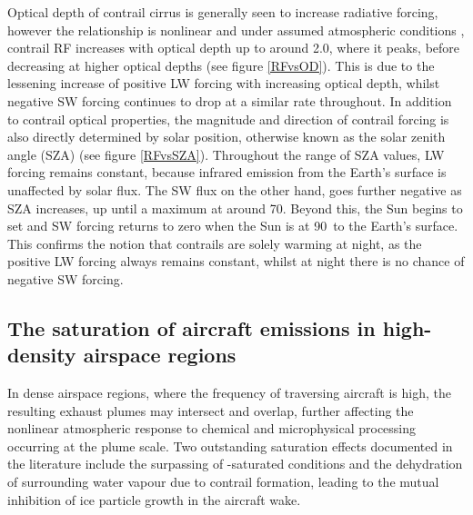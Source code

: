 Optical depth of contrail cirrus is generally seen to increase radiative forcing, however the relationship is nonlinear and under assumed atmospheric conditions \cite{Meerkotter1999, Schumann2012b}, contrail RF increases with optical depth up to around 2.0, where it peaks, before decreasing at higher optical depths (see figure \ref{RFvsOD}). This is due to the lessening increase of positive LW forcing with increasing optical depth, whilst negative SW forcing continues to drop at a similar rate throughout. In addition to contrail optical properties, the magnitude and direction of contrail forcing is also directly determined by solar position, otherwise known as the solar zenith angle (SZA) (see figure \ref{RFvsSZA}). Throughout the range of SZA values, LW forcing remains constant, because infrared emission from the Earth's surface is unaffected by solar flux. The SW flux on the other hand, goes further negative as SZA increases, up until a maximum at around 70\textdegree. Beyond this, the Sun begins to set and SW forcing returns to zero when the Sun is at 90\textdegree \ to the Earth's surface. This confirms the notion that contrails are solely warming at night, as the positive LW forcing always remains constant, whilst at night there is no chance of negative SW forcing.

\subsection{The saturation of aircraft emissions in high-density airspace regions}
\label{Saturation}
In dense airspace regions, where the frequency of traversing aircraft is high, the resulting exhaust plumes may intersect and overlap, further affecting the nonlinear atmospheric response to chemical and microphysical processing occurring at the plume scale. Two outstanding saturation effects documented in the literature include the surpassing of -saturated conditions and the dehydration of surrounding water vapour due to contrail formation, leading to the mutual inhibition of ice particle growth in the aircraft wake.

